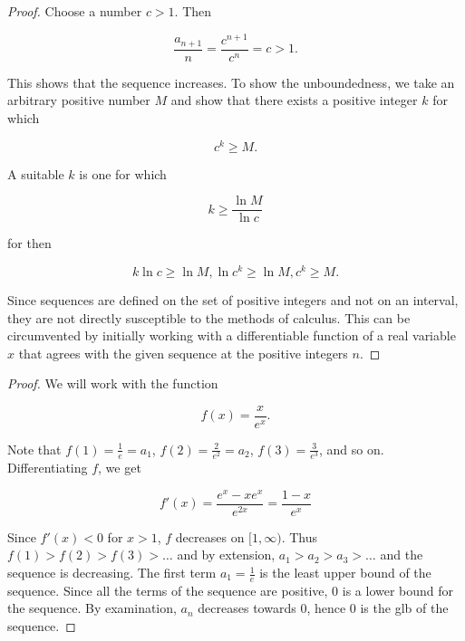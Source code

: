         \begin{proof}
            Choose a number $c > 1$. Then

            \[
                \frac{a_{n+1}}{n} = \frac{c^{n+1}}{c^n} = c > 1.
            \]

            This shows that the sequence increases. To show the unboundedness, we take an arbitrary positive number $M$ and show that there exists a positive integer $k$ for which

            \[
                c^k \geq M.
            \]

            A suitable $k$ is one for which

            \[
                k \geq \frac{\ln{M}}{\ln{c}}
            \]

            for then

            \[
                k\ln{c} \geq \ln{M}, \ln{c^k} \geq \ln{M},  c^k \geq M.
            \]

            Since sequences are defined on the set of positive integers and not on an interval, they are not directly susceptible to the methods of calculus. This can be circumvented by initially working with
            a differentiable function of a real variable $x$ that agrees with the given sequence at the positive integers $n$.
        \end{proof}

        \textit{}

        \begin{proof}
            We will work with the function

            \[
                f(x) = \frac{x}{e^x}.
            \]

            Note that $f(1) = \frac{1}{e} = a_1$, $f(2) = \frac{2}{e^2} = a_2$, $f(3) = \frac{3}{e^3}$, and so on. Differentiating $f$, we get

            \[
                f'(x) = \frac{e^x - xe^x}{e^{2x}} = \frac{1-x}{e^x}
            \]

            Since $f'(x) < 0$ for $x > 1$, $f$ decreases on $[1,\infty)$. Thus $f(1) > f(2) > f(3) > \dots$ and by extension, $a_1 > a_2 > a_3 > \dots$ and the sequence is decreasing. The first term $a_1 = \frac{1}{e}$
            is the least upper bound of the sequence. Since all the terms of the sequence are positive, 0 is a lower bound for the sequence. By examination, $a_n$ decreases towards 0, hence 0 is the glb of the sequence.
        \end{proof}

